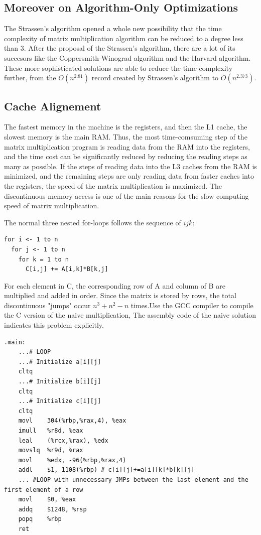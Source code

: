\documentclass[UTF8]{ctexart}
\begin{document}
\subsection{Moreover on Algorithm-Only Optimizations}
\label{subsec::MoAOO}
The Strassen's algorithm opened a whole new possibility that the time complexity of matrix multiplication algorithm can be reduced to a degree less than 3. After the proposal of the Strassen's algorithm, there are a lot of its succesors like the Coppersmith-Winograd algorithm and the Harvard algorithm. These more sophisticated solutions are able to reduce the time complexity further, from the \(O(n^{2.81})\) record created by Strassen's algorithm to \(O(n^{2.373})\).
\subsection{Cache Alignement}
The fastest memory in the machine is the registers, and then the L1 cache, the slowest memory is the main RAM. Thus, the most time-comsuming step of the matrix multiplication program is reading data from the RAM into the registers, and the time cost can be significantly reduced by reducing the reading steps as many as possible. If the steps of reading data into the L3 caches from the RAM is minimized, and the remaining steps are only reading data from faster caches into the registers, the speed of the matrix multiplication is maximized. The discontinuous memory access is one of the main reasons for the slow computing speed of matrix multiplication.

The normal three nested for-loops follows the sequence of \(ijk\):

\begin{lstlisting}[style=pseudocode]
for i <- 1 to n
  for j <- 1 to n
    for k = 1 to n
      C[i,j] += A[i,k]*B[k,j]
\end{lstlisting}
For each element in C, the corresponding row of A and column of B are
multiplied and added in order. Since the matrix is stored by rows, the
total discontinuous "jumps" occur \(n^3+n^2-n\) times.Use the GCC compiler
to compile the C version of the naive multiplication, The assembly code of the naive solution
indicates this problem explicitly.

\begin{lstlisting}[style=pseudocode]
  .main:
    ...# LOOP
    ...# Initialize a[i][j]
    cltq
    ...# Initialize b[i][j]
    cltq
    ...# Initialize c[i][j]
    cltq
    movl	304(%rbp,%rax,4), %eax
    imull	%r8d, %eax
    leal	(%rcx,%rax), %edx
    movslq	%r9d, %rax
    movl	%edx, -96(%rbp,%rax,4)
    addl	$1, 1108(%rbp) # c[i][j]+=a[i][k]*b[k][j]
    ... #LOOP with unnecessary JMPs between the last element and the first element of a row
    movl	$0, %eax
    addq	$1248, %rsp
    popq	%rbp
    ret
  \end{lstlisting}
\end{document}
